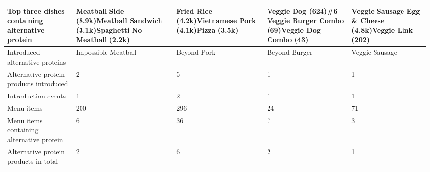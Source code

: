 \begin{longtable}{@{}V{3.0cm}V{\dimexpr(\linewidth-3.0cm-30pt)/4\relax}V{\dimexpr(\linewidth-3.0cm-30pt)/4\relax}V{\dimexpr(\linewidth-3.0cm-30pt)/4\relax}V{\dimexpr(\linewidth-3.0cm-30pt)/4\relax}@{}}
\midrule[0.1pt]
Top three dishes containing alternative protein & Meatball Side (8.9k)\newline Meatball Sandwich (3.1k)\newline Spaghetti No Meatball (2.2k) & Fried Rice (4.2k)\newline Vietnamese Pork (4.1k)\newline Pizza (3.5k) & Veggie Dog (624)\newline \#6 Veggie Burger Combo (69)\newline Veggie Dog Combo (43) & Veggie Sausage Egg \& Cheese (4.8k)\newline Veggie Link (202) \\*
\midrule[0.1pt]
Introduced alternative proteins & Impossible Meatball & Beyond Pork & Beyond Burger & Veggie Sausage \\*
\midrule[0.1pt]
Alternative protein products introduced & 2 & 5 & 1 & 1 \\*
\midrule[0.1pt]
Introduction events & 1 & 2 & 1 & 1 \\*
\midrule[0.1pt]
Menu items & 200 & 296 & 24 & 71 \\*
\midrule[0.1pt]
Menu items containing alternative protein & 6 & 36 & 7 & 3 \\*
\midrule[0.1pt]
Alternative protein products in total & 2 & 6 & 2 & 1 \\
\end{longtable}
\endgroup
